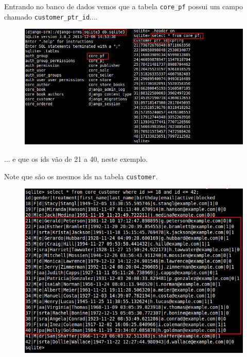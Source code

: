 \documentclass[aspectratio=169]{beamer}
\begin{document}
{\begin{frame}
\end{frame}

\begin{frame}
	
Entrando no banco de dados vemos que a tabela \texttt{core\_pf} possui um campo chamado \texttt{customer\_ptr\_id}....

	\begin{figure}[h]
	  \centering
  		\includegraphics[height=.7\paperheight]{img/core_pf}
	\end{figure}

... e que os ids vão de 21 a 40, neste exemplo.
\end{frame}

\begin{frame}
Note que são os mesmos ids na tabela \texttt{customer}.

	\begin{figure}[h]
	  \centering
  		\includegraphics[height=.7\paperheight]{img/customer_table}
	\end{figure}


\end{frame}}
\end{document}
